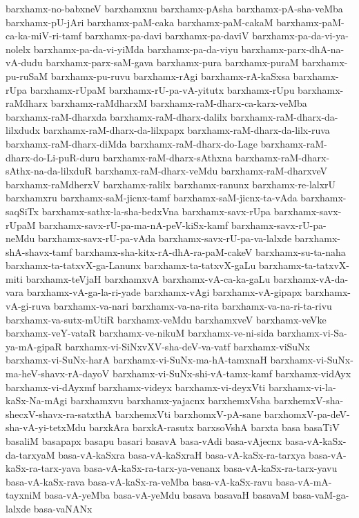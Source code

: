 {barxhamx-no-babxneV
barxhamxnu
barxhamx-pAsha
barxhamx-pA-sha-veMba
barxhamx-pU-jAri
barxhamx-paM-caka
barxhamx-paM-cakaM
barxhamx-paM-ca-ka-miV-ri-tamf
barxhamx-pa-davi
barxhamx-pa-daviV
barxhamx-pa-da-vi-ya-nolelx
barxhamx-pa-da-vi-yiMda
barxhamx-pa-da-viyu
barxhamx-parx-dhA-na-vA-dudu
barxhamx-parx-saM-gava
barxhamx-pura
barxhamx-puraM
barxhamx-pu-ruSaM
barxhamx-pu-ruvu
barxhamx-rAgi
barxhamx-rA-kaSxsa
barxhamx-rUpa
barxhamx-rUpaM
barxhamx-rU-pa-vA-yitutx
barxhamx-rUpu
barxhamx-raMdharx
barxhamx-raMdharxM
barxhamx-raM-dharx-ca-karx-veMba
barxhamx-raM-dharxda
barxhamx-raM-dharx-dalilx
barxhamx-raM-dharx-da-lilxdudx
barxhamx-raM-dharx-da-lilxpapx
barxhamx-raM-dharx-da-lilx-ruva
barxhamx-raM-dharx-diMda
barxhamx-raM-dharx-do-Lage
barxhamx-raM-dharx-do-Li-puR-duru
barxhamx-raM-dharx-sAthxna
barxhamx-raM-dharx-sAthx-na-da-lilxduR
barxhamx-raM-dharx-veMdu
barxhamx-raM-dharxveV
barxhamx-raMdherxV
barxhamx-ralilx
barxhamx-ranunx
barxhamx-re-lalxrU
barxhamxru
barxhamx-saM-jicnx-tamf
barxhamx-saM-jicnx-ta-vAda
barxhamx-saqSiTx
barxhamx-sathx-la-sha-bedxVna
barxhamx-savx-rUpa
barxhamx-savx-rUpaM
barxhamx-savx-rU-pa-ma-nA-peV-kiSx-kamf
barxhamx-savx-rU-pa-neMdu
barxhamx-savx-rU-pa-vAda
barxhamx-savx-rU-pa-va-lalxde
barxhamx-shA-shavx-tamf
barxhamx-sha-kitx-rA-dhA-ra-paM-cakeV
barxhamx-su-ta-naha
barxhamx-ta-tatxvX-ga-Lanunx
barxhamx-ta-tatxvX-gaLu
barxhamx-ta-tatxvX-miti
barxhamx-teVjaH
barxhamxvA
barxhamx-vA-ca-ka-gaLu
barxhamx-vA-da-vara
barxhamx-vA-ga-la-ri-yade
barxhamx-vAgi
barxhamx-vA-gipapx
barxhamx-vA-gi-ruva
barxhamx-va-nari
barxhamx-va-na-rita
barxhamx-va-na-ri-ta-rivu
barxhamx-va-sutx-mUtiR
barxhamx-veMdu
barxhamxveV
barxhamx-veVke
barxhamx-veY-vataR
barxhamx-ve-nikuM
barxhamx-ve-ni-sida
barxhamx-vi-Sa-ya-mA-gipaR
barxhamx-vi-SiNxvXV-sha-deV-va-vatf
barxhamx-viSuNx
barxhamx-vi-SuNx-harA
barxhamx-vi-SuNx-ma-hA-tamxnaH
barxhamx-vi-SuNx-ma-heV-shavx-rA-dayoV
barxhamx-vi-SuNx-shi-vA-tamx-kamf
barxhamx-vidAyx
barxhamx-vi-dAyxmf
barxhamx-videyx
barxhamx-vi-deyxVti
barxhamx-vi-la-kaSx-Na-mAgi
barxhamxvu
barxhamx-yajacnx
barxhemxVsha
barxhemxV-sha-shecxV-shavx-ra-satxthA
barxhemxVti
barxhomxV-pA-sane
barxhomxV-pa-deV-sha-vA-yi-tetxMdu
barxkAra
barxkA-rasutx
barxsoVshA
barxta
basa
basaTiV
basaliM
basapapx
basapu
basari
basavA
basa-vAdi
basa-vAjecnx
basa-vA-kaSx-da-tarxyaM
basa-vA-kaSxra
basa-vA-kaSxraH
basa-vA-kaSx-ra-tarxya
basa-vA-kaSx-ra-tarx-yava
basa-vA-kaSx-ra-tarx-ya-venanx
basa-vA-kaSx-ra-tarx-yavu
basa-vA-kaSx-rava
basa-vA-kaSx-ra-veMba
basa-vA-kaSx-ravu
basa-vA-mA-tayxniM
basa-vA-yeMba
basa-vA-yeMdu
basava
basavaH
basavaM
basa-vaM-ga-lalxde
basa-vaNANx
}
